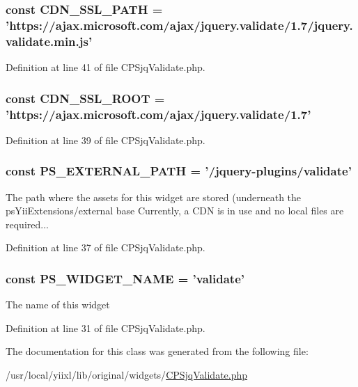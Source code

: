 \hypertarget{classCPSjqValidate_ae2b9c6713d89ec8f2d3d7ab20e74c9c5}{
\subsubsection[{CDN\_\-SSL\_\-PATH}]{\setlength{\rightskip}{0pt plus 5cm}const {\bf CDN\_\-SSL\_\-PATH} = 'https://ajax.microsoft.com/ajax/jquery.validate/1.7/jquery.validate.min.js'}}
\label{classCPSjqValidate_ae2b9c6713d89ec8f2d3d7ab20e74c9c5}


Definition at line 41 of file CPSjqValidate.php.

\hypertarget{classCPSjqValidate_a66a542d2b3dc21378203a6c741b80b28}{
\subsubsection[{CDN\_\-SSL\_\-ROOT}]{\setlength{\rightskip}{0pt plus 5cm}const {\bf CDN\_\-SSL\_\-ROOT} = 'https://ajax.microsoft.com/ajax/jquery.validate/1.7'}}
\label{classCPSjqValidate_a66a542d2b3dc21378203a6c741b80b28}


Definition at line 39 of file CPSjqValidate.php.

\hypertarget{classCPSjqValidate_a8ccb5e1d65c091f944a6aa8c5be834ca}{
\subsubsection[{PS\_\-EXTERNAL\_\-PATH}]{\setlength{\rightskip}{0pt plus 5cm}const {\bf PS\_\-EXTERNAL\_\-PATH} = '/jquery-\/plugins/validate'}}
\label{classCPSjqValidate_a8ccb5e1d65c091f944a6aa8c5be834ca}
The path where the assets for this widget are stored (underneath the psYiiExtensions/external base Currently, a CDN is in use and no local files are required... 

Definition at line 37 of file CPSjqValidate.php.

\hypertarget{classCPSjqValidate_ae357f9dc377f7de0d12010b2ced28cbc}{
\subsubsection[{PS\_\-WIDGET\_\-NAME}]{\setlength{\rightskip}{0pt plus 5cm}const {\bf PS\_\-WIDGET\_\-NAME} = 'validate'}}
\label{classCPSjqValidate_ae357f9dc377f7de0d12010b2ced28cbc}
The name of this widget 

Definition at line 31 of file CPSjqValidate.php.



The documentation for this class was generated from the following file:\begin{DoxyCompactItemize}
\item 
/usr/local/yiixl/lib/original/widgets/\hyperlink{CPSjqValidate_8php}{CPSjqValidate.php}\end{DoxyCompactItemize}
